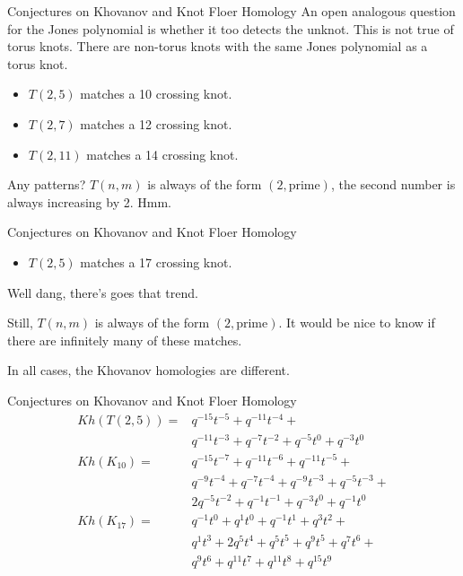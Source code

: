 \documentclass{beamer}
\begin{document}
    \begin{frame}{Conjectures on Khovanov and Knot Floer Homology}
        An open analogous question for the Jones polynomial is whether it too
        detects the unknot. This is not true of torus knots. There are
        non-torus knots with the same Jones polynomial as a torus knot.
        \begin{itemize}
            \item $T(2,5)$ matches a 10 crossing knot.
            \item $T(2,7)$ matches a 12 crossing knot.
            \item $T(2,11)$ matches a 14 crossing knot.
        \end{itemize}
        Any patterns? $T(n,m)$ is always of the form $(2,\text{prime})$,
        the second number is always increasing by 2. Hmm.
    \end{frame}
    \begin{frame}{Conjectures on Khovanov and Knot Floer Homology}
        \begin{itemize}
            \item $T(2,5)$ matches a 17 crossing knot.
        \end{itemize}
        Well dang, there's goes that trend.
        \par\hfill\par
        Still, $T(n,m)$ is always of the form $(2,\text{prime})$. It would
        be nice to know if there are infinitely many of these matches.
        \par\hfill\par
        In all cases, the Khovanov homologies are different.
    \end{frame}
    \begin{frame}{Conjectures on Khovanov and Knot Floer Homology}
        \begin{align}
            Kh(T(2,5))=&q^{-15}t^{-5}+q^{-11}t^{-4}+\nonumber\\
                &q^{-11}t^{-3}+q^{-7}t^{-2}+q^{-5}t^{0}+q^{-3}t^{0}\\
            Kh(K_{10})=&q^{-15}t^{-7}+q^{-11}t^{-6}+q^{-11}t^{-5}+\nonumber\\
                &q^{-9}t^{-4}+q^{-7}t^{-4}+q^{-9}t^{-3}+q^{-5}t^{-3}+\nonumber\\
                &2q^{-5}t^{-2}+q^{-1}t^{-1}+q^{-3}t^{0}+q^{-1}t^{0}\\
            Kh(K_{17})=&q^{-1}t^{0}+q^{1}t^{0}+q^{-1}t^{1}+q^{3}t^{2}+\nonumber\\
                &q^{1}t^{3}+2q^{5}t^{4}+q^{5}t^{5}+q^{9}t^{5}+q^{7}t^{6}+\nonumber\\
                &q^{9}t^{6}+q^{11}t^{7}+q^{11}t^{8}+q^{15}t^{9}
        \end{align}
    \end{frame}
\end{document}
